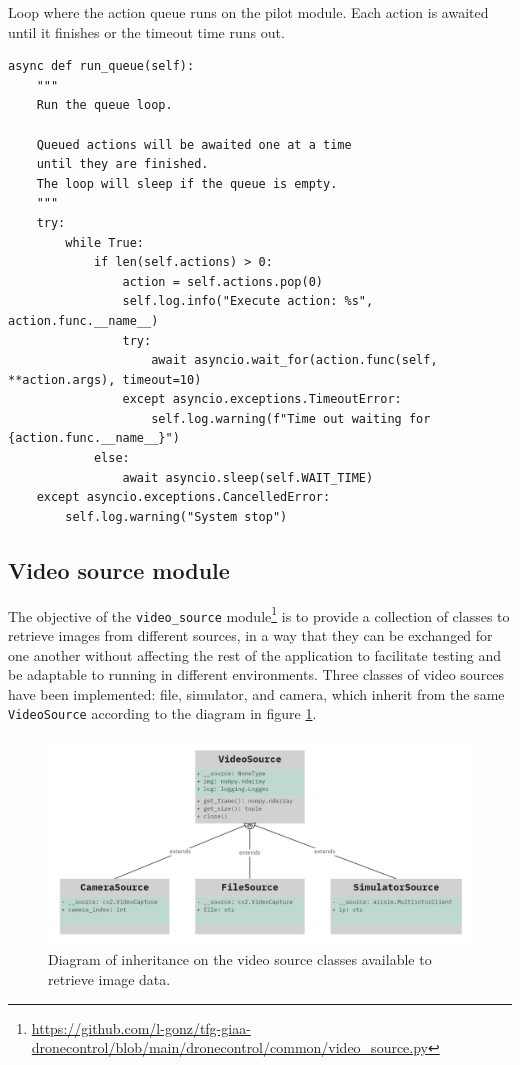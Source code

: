 \begin{listing}[h]
    \caption{Loop where the action queue runs on the pilot module. Each action is awaited until it finishes or the timeout time runs out.}{}
    \label{lst:pilot-queue}
    \begin{verbatim}
async def run_queue(self):
    """
    Run the queue loop.
    
    Queued actions will be awaited one at a time
    until they are finished.
    The loop will sleep if the queue is empty.
    """
    try:
        while True:
            if len(self.actions) > 0:
                action = self.actions.pop(0)
                self.log.info("Execute action: %s", action.func.__name__)
                try:
                    await asyncio.wait_for(action.func(self, **action.args), timeout=10)
                except asyncio.exceptions.TimeoutError:
                    self.log.warning(f"Time out waiting for {action.func.__name__}")
            else:
                await asyncio.sleep(self.WAIT_TIME)
    except asyncio.exceptions.CancelledError:
        self.log.warning("System stop")
    \end{verbatim}
\end{listing}


\subsection{Video source module}
\label{subsec:viz-source-module}

The objective of the \texttt{video\_source} module\footnote{\url{https://github.com/l-gonz/tfg-giaa-dronecontrol/blob/main/dronecontrol/common/video_source.py}} is to provide a collection of classes to retrieve images from different sources,
in a way that they can be exchanged for one another without affecting the rest of the application to facilitate testing and be adaptable to running in different environments.
Three classes of video sources have been implemented: file, simulator, and camera, which inherit from the same \texttt{VideoSource} according to the diagram in figure \ref{fig:video-source-inheritance}.

\begin{figure}
  \centering
  \includegraphics[width=\textwidth, keepaspectratio]{img/uml-video-source.jpg}
  \caption{Diagram of inheritance on the video source classes available to retrieve image data.}
  \label{fig:video-source-inheritance}
\end{figure}

